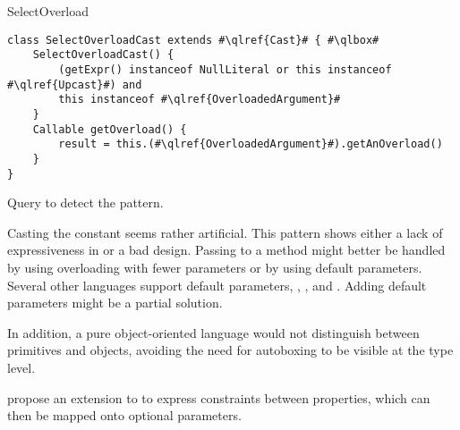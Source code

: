 \begin{pattern}{SelectOverload}
\begin{listing}
\begin{verbatim}
class SelectOverloadCast extends #\qlref{Cast}# { #\qlbox#
	SelectOverloadCast() {
		(getExpr() instanceof NullLiteral or this instanceof #\qlref{Upcast}#) and
		this instanceof #\qlref{OverloadedArgument}#
	}
	Callable getOverload() {
		result = this.(#\qlref{OverloadedArgument}#).getAnOverload()
	}
}
\end{verbatim}
\caption{Query to detect the \thisp{} pattern.}
\label{lst:ql:SelectOverloadCast}
\end{listing}

\issues{}
Casting the  constant seems rather artificial.
This pattern shows either a lack of expressiveness in \java{} or a bad \api{} design.
Passing  to a method might better be handled by using overloading with fewer parameters or by using default parameters.
Several other languages support default parameters,
\eg, \scala{}, \csharp{} and \cpp{}.
Adding default parameters might be a partial solution.

In addition, a pure object-oriented language would not distinguish between primitives and objects,
avoiding the need for autoboxing to be visible at the type level.

\cite{oostvogelsStaticTypingComplex2018a} propose an extension to \typescript{} to express constraints between properties,
which can then be mapped onto optional parameters.

\end{pattern}
